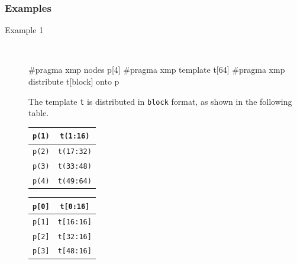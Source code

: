 \subsubsection*{Examples}
\begin{description}
\item[Example 1]~\\[0.5cm]
\begin{minipage}{0.43\hsize}
\begin{center}
\end{center}
\end{minipage}
%
\begin{minipage}{0.5\hsize}
\begin{center}
\begin{XCexampleR}
#pragma xmp nodes p[4]
#pragma xmp template t[64]
#pragma xmp distribute t[block] onto p
\end{XCexampleR}
\end{center}
\end{minipage}

The template {\tt t} is distributed in {\tt block} format, as shown in the
following table.

\begin{minipage}{0.43\hsize}
\begin{center}
\begin{tabular}{|c|c|} \hline
{\tt p(1)} & {\tt t(1:16)}  \\ \hline
{\tt p(2)} & {\tt t(17:32)} \\ \hline
{\tt p(3)} & {\tt t(33:48)} \\ \hline
{\tt p(4)} & {\tt t(49:64)} \\ \hline
\end{tabular}
\end{center}
\end{minipage}
%
\begin{minipage}{0.5\hsize}
\begin{center}
\begin{tabular}{|c|c|} \hline
{\tt p[0]} & {\tt t[0:16]}  \\ \hline
{\tt p[1]} & {\tt t[16:16]} \\ \hline
{\tt p[2]} & {\tt t[32:16]} \\ \hline
{\tt p[3]} & {\tt t[48:16]} \\ \hline
\end{tabular}
\end{center}
\end{minipage}


\end{description}
